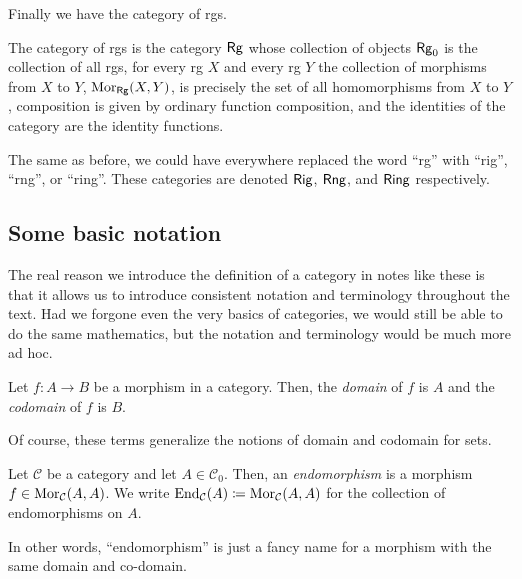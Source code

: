 Finally we have the category of rgs.
\begin{exm}
The category of rgs is the category $\Rg$\index[notation]{$\Rg$} whose collection of objects $\mathsf{Rg} _0$ is the collection of all rgs, for every rg $X$ and every rg $Y$ the collection of morphisms from $X$ to $Y$, $\operatorname{Mor} _{\mathsf{Rg}}(X,Y)$, is precisely the set of all homomorphisms from $X$ to $Y$, composition is given by ordinary function composition, and the identities of the category are the identity functions.
\begin{rmk}
The same as before, we could have everywhere replaced the word ``rg'' with ``rig'', ``rng'', or ``ring''.  These categories are denoted $\Rig$\index[notation]{$\Rig$}, $\Rng$\index[notation]{$\Rng$}, and $\Ring$\index[notation]{$\Ring$} respectively.
\end{rmk}
\end{exm}

\subsection{Some basic notation}

The real reason we introduce the definition of a category in notes like these is that it allows us to introduce consistent notation and terminology throughout the text.  Had we forgone even the very basics of categories, we would still be able to do the same mathematics, but the notation and terminology would be much more ad hoc.
\begin{dfn}
Let $f:A\rightarrow B$ be a morphism in a category.  Then, the \emph{domain} of $f$ is $A$ and the \emph{codomain} of $f$ is $B$.
\begin{rmk}
Of course, these terms generalize the notions of domain and codomain for sets.
\end{rmk}
\end{dfn}
\begin{dfn}[Endomorphism]\label{Endomorphism}
Let $\mathcal{C}$ be a category and let $A\in \mathcal{C}_0$.  Then, an \emph{endomorphism} is a morphism $f\in \operatorname{Mor} _{\mathcal{C}}(A,A)$.  We write $\operatorname{End} _{\mathcal{C}}(A)\coloneqq \operatorname{Mor} _{\mathcal{C}}(A,A)$ for the collection of endomorphisms on $A$.
\end{dfn}
In other words, ``endomorphism'' is just a fancy name for a morphism with the same domain and co-domain.

